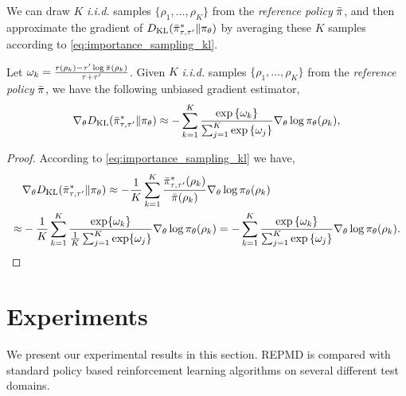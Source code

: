 \documentclass{article} %
\begin{document}
We can draw $K$ \textit{i.i.d.} samples $\{\rho_1, \dots, \rho_K\}$ from the \emph{reference policy} $\bar{\pi}$, and then approximate the gradient of $D_{\mathrm{KL}}(\bar{\pi}_{\tau,\tau^{\prime}}^* \| \pi_\theta)$ by averaging these $K$ samples according to \cref{eq:importance_sampling_kl}. 

\begin{thm}
\label{thm:repmdgradientestimate}
Let $\omega_k = \frac{r(\rho_k) - \tau^{\prime} \log{\bar{\pi}(\rho_k)} }{\tau + \tau^{\prime}}$. Given $K$ \emph{i.i.d.} samples $\{\rho_1, \dots, \rho_K\}$ from the \emph{reference policy} $\bar{\pi}$, we have the following unbiased gradient estimator,
\begin{equation}
\label{eq:gradient_estimator}
	\nabla_{\theta} D_{\mathrm{KL}}(\bar{\pi}_{\tau,\tau^{\prime}}^* \| \pi_\theta)\approx -\sum\limits_{k=1}^K{ \frac{ \exp\left\{ \omega_k \right\} }{ \sum_{j=1}^K{ \exp\left\{ \omega_j \right\}}} \nabla_{\theta} \log{\pi_\theta(\rho_k)} },
\end{equation}
\end{thm}
\begin{proof}
According to \cref{eq:importance_sampling_kl} we have,
\begin{equation}
\begin{split}
	&\nabla_{\theta} D_{\mathrm{KL}}(\bar{\pi}_{\tau,\tau^{\prime}}^* \| \pi_\theta) \approx -\frac{1}{K}\sum_{k=1}^K \frac{\bar{\pi}_{\tau,\tau^{\prime}}^* (\rho_k)}{\bar{\pi}(\rho_k)} \nabla_{\theta} \log \pi_\theta(\rho_k) \\ 
	\approx & -\frac{1}{K}\sum_{k=1}^K \frac{\exp \{\omega_k\}} {\frac{1}{K} \sum_{j=1}^K \exp \{\omega_j\}} \nabla_{\theta} \log \pi_\theta(\rho_k) =  -\sum\limits_{k=1}^K{ \frac{ \exp\left\{ \omega_k \right\} }{ \sum_{j=1}^K{ \exp\left\{ \omega_j \right\}}} \nabla_{\theta} \log{\pi_\theta(\rho_k)} } \qedhere.
\end{split}
\end{equation}
\end{proof}

\section{Experiments}
\label{sec:experiments}

We present our experimental results in this section. REPMD is compared with standard policy based reinforcement learning algorithms on several different test domains.
\end{document}
